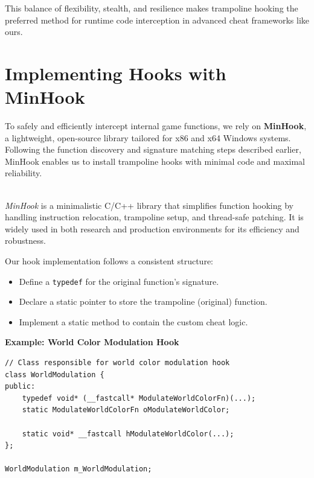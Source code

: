 This balance of flexibility, stealth, and resilience makes trampoline hooking the preferred method for runtime code interception in advanced cheat frameworks like ours.

\section{Implementing Hooks with MinHook}

To safely and efficiently intercept internal game functions, we rely on \textbf{MinHook}, a lightweight, open-source library tailored for x86 and x64 Windows systems.  
Following the function discovery and signature matching steps described earlier, MinHook enables us to install trampoline hooks with minimal code and maximal reliability.

\begin{tcolorbox}[colback=gray!10, colframe=gray!50, boxrule=0pt, sharp corners, width=\linewidth, left=1mm, right=1mm, top=0.5mm, bottom=0.5mm]
 \\
\textit{MinHook} is a minimalistic C/C++ library that simplifies function hooking by handling instruction relocation, trampoline setup, and thread-safe patching. It is widely used in both research and production environments for its efficiency and robustness.
\end{tcolorbox}

Our hook implementation follows a consistent structure:

\begin{itemize}
    \item Define a \texttt{typedef} for the original function’s signature.
    \item Declare a static pointer to store the trampoline (original) function.
    \item Implement a static method to contain the custom cheat logic.
\end{itemize}

\textbf{Example: World Color Modulation Hook}

\begin{lstlisting}[style=cppstyle]
// Class responsible for world color modulation hook
class WorldModulation {
public:
    typedef void* (__fastcall* ModulateWorldColorFn)(...);
    static ModulateWorldColorFn oModulateWorldColor;

    static void* __fastcall hModulateWorldColor(...);
};

WorldModulation m_WorldModulation;
\end{lstlisting}

